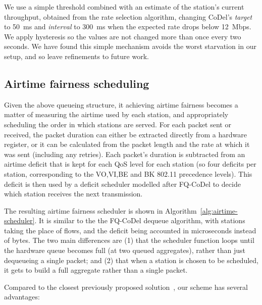 \documentclass[english]{scrartcl}
\begin{document}
We use a simple threshold combined with an estimate of the station's current
throughput, obtained from the rate selection algorithm, changing CoDel's
\emph{target} to 50 ms and \emph{interval} to 300 ms when the expected rate drops
below 12 Mbps. We apply hysteresis so the values are not changed more than
once every two seconds. We have found this simple mechanism avoids the worst
starvation in our setup, and so leave refinements to future work.

\subsection{Airtime fairness scheduling}
\label{sec:airtime-scheduler}
Given the above queueing structure, it achieving airtime fairness becomes a
matter of measuring the airtime used by each station, and appropriately
scheduling the order in which stations are served. For each packet sent or
received, the packet duration can either be extracted directly from a hardware
register, or it can be calculated from the packet length and the rate at which
it was sent (including any retries). Each packet's duration is subtracted from
an airtime deficit that is kept for each QoS level for each station (so four
deficits per station, corresponding to the VO,VI,BE and BK 802.11 precedence
levels). This deficit is then used by a deficit scheduler modelled after
FQ-CoDel to decide which station receives the next transmission.

The resulting airtime fairness scheduler is shown in
Algorithm \ref{alg:airtime-scheduler}. It is similar to the the FQ-CoDel dequeue
algorithm, with stations taking the place of flows, and the deficit being
accounted in microseconds instead of bytes. The two main differences are (1)
that the scheduler function loops until the hardware queue becomes full (at two
queued aggregates), rather than just dequeueing a single packet; and (2) that
when a station is chosen to be scheduled, it gets to build a full aggregate
rather than a single packet.

Compared to the closest previously proposed
solution \cite{garroppo_providing_2007}, our scheme has several advantages:
\end{document}
